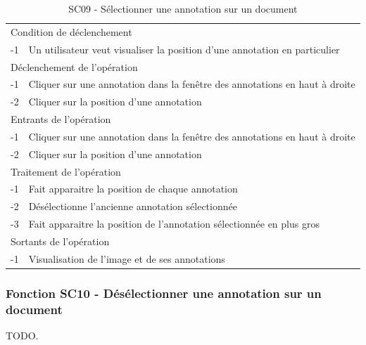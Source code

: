 \documentclass[a4paper]{article}
\begin{document}
\begin{table}[H]
  \centering
   \small
	\begin{tabular}{|c|p{12cm}|}
   		\hline
   			\rowcolor{lightgray}\multicolumn{2}{|c|}{\textbf{SC09 - Sélectionner une annotation sur un document}} \\
   		\hline
   			\multicolumn{2}{|l|}{Condition de d\'eclenchement} \\
   		\hline
   			-1 & Un utilisateur veut visualiser la position d’une annotation en particulier\\
   		\hline
   			\multicolumn{2}{|l|}{D\'eclenchement de l'op\'eration} \\
   		\hline
   			-1 & Cliquer sur une annotation dans la fenêtre des annotations en haut à droite\\
            -2 & Cliquer sur la position d'une annotation\\
   		\hline
   			\multicolumn{2}{|l|}{Entrants de l'op\'eration} \\
   		\hline
   			-1 & Cliquer sur une annotation dans la fenêtre des annotations en haut à droite\\
            -2 & Cliquer sur la position d'une annotation\\
   		\hline
   			\multicolumn{2}{|l|}{Traitement de l'op\'eration} \\
  		\hline
   			-1 & Fait apparaitre la position de chaque annotation\\
			-2 & Désélectionne l’ancienne annotation sélectionnée\\
			-3 & Fait apparaitre la position de l’annotation sélectionnée en plus gros\\
   		\hline
   			\multicolumn{2}{|l|}{Sortants de l'op\'eration} \\
   		\hline
   			-1 & Visualisation de l’image et de ses annotations\\
   		\hline
	\end{tabular}
  \caption{SC09 - Sélectionner une annotation sur un document}
  \normalsize
  \label{tab:selectionner_annotation}
\end{table}

\subsubsection{Fonction SC10 - Désélectionner une annotation sur un document}
TODO.\\
\end{document}
